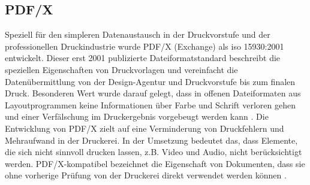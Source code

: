 \subsection{PDF/X}
Speziell für den simpleren Datenaustausch in der Druckvorstufe und der professionellen Druckindustrie wurde PDF/X (Exchange) als \gls{iso} 15930:2001 entwickelt. Dieser erst 2001 publizierte Dateiformatstandard beschreibt die speziellen Eigenschaften von Druckvorlagen und vereinfacht die Datenübermittlung von der Design-Agentur und Druckvorstufe bis zum finalen Druck. Besonderen Wert wurde darauf gelegt, dass in offenen Dateiformaten aus Layoutprogrammen keine Informationen über Farbe und Schrift verloren gehen und einer Verfälschung im Druckergebnis vorgebeugt werden kann \cite{adobe-pdf-e}. Die Entwicklung von PDF/X zielt auf eine Verminderung von Druckfehlern und Mehraufwand in der Druckerei. In der Umsetzung bedeutet das, dass Elemente, die sich nicht sinnvoll drucken lassen, z.B. Video und Audio, nicht berücksichtigt werden. PDF/X-kompatibel bezeichnet die Eigenschaft von Dokumenten, dass sie ohne vorherige Prüfung von der Druckerei direkt verwendet werden können \cite{adobe-pdf-x}. \\
